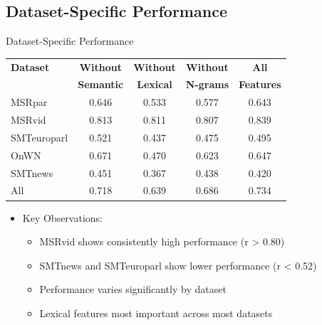\documentclass{beamer}
\begin{document}
\subsection{Dataset-Specific Performance}
\begin{frame}{Dataset-Specific Performance}
    \begin{center}
        \begin{tabular}{|l|c|c|c|c|}
            \hline
            \textbf{Dataset} & \textbf{Without} & \textbf{Without} & \textbf{Without} & \textbf{All} \\
            & \textbf{Semantic} & \textbf{Lexical} & \textbf{N-grams} & \textbf{Features} \\
            \hline
            MSRpar & 0.646 & 0.533 & 0.577 & 0.643 \\
            MSRvid & 0.813 & 0.811 & 0.807 & 0.839 \\
            SMTeuroparl & 0.521 & 0.437 & 0.475 & 0.495 \\
            OnWN & 0.671 & 0.470 & 0.623 & 0.647 \\
            SMTnews & 0.451 & 0.367 & 0.438 & 0.420 \\
            \hline
            All & 0.718 & 0.639 & 0.686 & 0.734 \\
            \hline
        \end{tabular}
    \end{center}
    \begin{itemize}
        \item Key Observations:
        \begin{itemize}
            \item MSRvid shows consistently high performance (r \textgreater{} 0.80)
            \item SMTnews and SMTeuroparl show lower performance (r \textless{} 0.52)
            \item Performance varies significantly by dataset
            \item Lexical features most important across most datasets
        \end{itemize}
    \end{itemize}
\end{frame}

\end{document}
